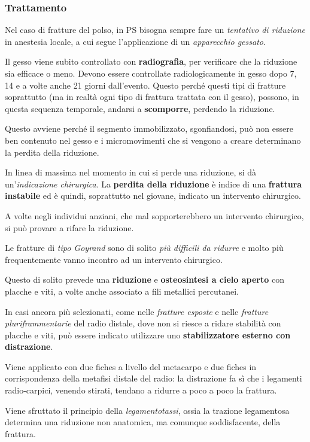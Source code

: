 \subsubsection{Trattamento}

Nel caso di fratture del polso, in PS bisogna sempre fare un \emph{tentativo di riduzione} in anestesia locale, a cui segue l'applicazione di un \emph{apparecchio gessato}.

Il gesso viene subito controllato con \textbf{radiografia}, per verificare che la riduzione sia efficace o meno. Devono essere
controllate radiologicamente in gesso dopo 7, 14 e a volte anche 21 giorni dall'evento. Questo perché questi tipi di fratture soprattutto (ma in realtà ogni tipo di frattura trattata con il gesso), possono, in questa sequenza temporale, andarsi a \textbf{scomporre}, perdendo la riduzione.

Questo avviene perché il segmento immobilizzato, sgonfiandosi, può non essere ben contenuto nel gesso e i micromovimenti che si vengono a creare determinano la perdita della riduzione.

In linea di massima nel momento in cui si perde una riduzione, si dà un'\emph{indicazione chirurgica}. La \textbf{perdita della riduzione} è indice di una \textbf{frattura instabile} ed è quindi, soprattutto nel giovane, indicato un intervento chirurgico.

A volte negli individui anziani, che mal sopporterebbero un intervento chirurgico, si può provare a rifare la riduzione.

Le fratture di \emph{tipo Goyrand} sono di solito \emph{più difficili da ridurre} e molto più frequentemente vanno incontro ad un intervento
chirurgico.

Questo di solito prevede una \textbf{riduzione} e \textbf{osteosintesi a cielo aperto} con placche e viti, a volte anche associato a fili metallici percutanei.

In casi ancora più selezionati, come nelle \emph{fratture esposte} e nelle \emph{fratture pluriframmentarie} del radio distale, dove non si
riesce a ridare stabilità con placche e viti, può essere indicato utilizzare uno \textbf{stabilizzatore esterno con distrazione}.

Viene applicato con due fiches a livello del metacarpo e due fiches in corrispondenza della metafisi distale del radio: la distrazione fa sì
che i legamenti radio-carpici, venendo stirati, tendano a ridurre a poco a poco la frattura.

Viene sfruttato il principio della \emph{legamentotassi}, ossia la trazione legamentosa determina una riduzione non anatomica, ma comunque
soddisfacente, della frattura.

